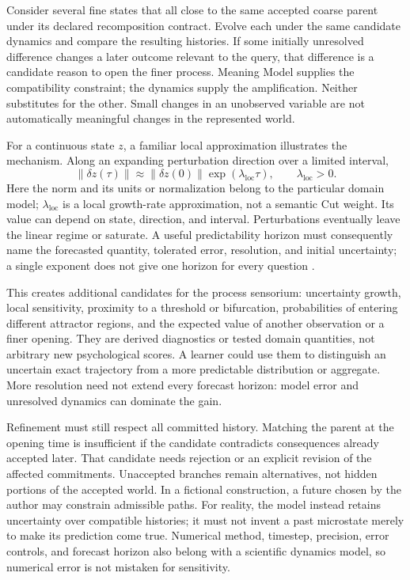 \documentclass[10pt]{article}
\begin{document}
Consider several fine states that all close to the same accepted coarse
parent under its declared recomposition contract. Evolve each under the same
candidate dynamics and compare the resulting histories. If some initially
unresolved difference changes a later outcome relevant to the query, that
difference is a candidate reason to open the finer process. Meaning Model
supplies the compatibility constraint; the dynamics supply the amplification.
Neither substitutes for the other. Small changes in an unobserved variable
are not automatically meaningful changes in the represented world.

For a continuous state $z$, a familiar local approximation illustrates the
mechanism. Along an expanding perturbation direction over a limited interval,
\begin{equation}
  \lVert\delta z(\tau)\rVert
  \approx \lVert\delta z(0)\rVert
  \exp(\lambda_{\mathrm{loc}}\tau),
  \qquad \lambda_{\mathrm{loc}}>0.
  \label{eq:local-sensitive-divergence}
\end{equation}
Here the norm and its units or normalization belong to the particular domain
model; $\lambda_{\mathrm{loc}}$ is a local growth-rate approximation, not a
semantic Cut weight. Its value can depend on state, direction, and interval.
Perturbations eventually leave the linear regime or saturate. A useful
predictability horizon must consequently name the forecasted quantity,
tolerated error, resolution, and initial uncertainty; a single exponent does
not give one horizon for every question
\cite{lorenz1969multiscale,nese1989local,aurell1997finite}.

This creates additional candidates for the process sensorium: uncertainty
growth, local sensitivity, proximity to a threshold or bifurcation,
probabilities of entering different attractor regions, and the expected value
of another observation or a finer opening. They are derived diagnostics or
tested domain quantities, not arbitrary new psychological scores. A learner
could use them to distinguish an uncertain exact trajectory from a more
predictable distribution or aggregate. More resolution need not extend every
forecast horizon: model error and unresolved dynamics can dominate the gain.

Refinement must still respect all committed history. Matching the parent at
the opening time is insufficient if the candidate contradicts consequences
already accepted later. That candidate needs rejection or an explicit revision
of the affected commitments. Unaccepted branches remain alternatives, not
hidden portions of the accepted world. In a fictional construction, a future
chosen by the author may constrain admissible paths. For reality, the model
instead retains uncertainty over compatible histories; it must not invent a
past microstate merely to make its prediction come true. Numerical method,
timestep, precision, error controls, and forecast horizon also belong with a
scientific dynamics model, so numerical error is not mistaken for sensitivity.
\end{document}
